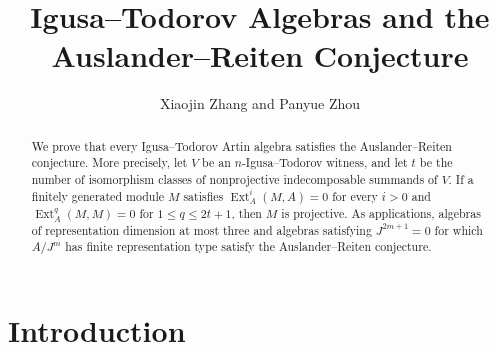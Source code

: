 \documentclass[a4paper,reqno]{amsart}
\numberwithin{equation}{section}
\theoremstyle{definition}
\DeclareMathOperator{\Ext}{Ext}
\begin{document}
\title[Igusa--Todorov algebras and the Auslander--Reiten conjecture]
{Igusa--Todorov Algebras and the Auslander--Reiten Conjecture}
\author[Xiaojin Zhang and Panyue Zhou]{Xiaojin Zhang and Panyue Zhou}

\makeatletter
{}
\makeatother
\date{}



\begin{abstract}
We prove that every Igusa--Todorov Artin algebra satisfies the Auslander--Reiten conjecture. More precisely, let $V$ be an $n$-Igusa--Todorov witness, and let $t$ be the number of isomorphism classes of nonprojective indecomposable summands of $V$. If a finitely generated module $M$ satisfies $\Ext_A^i(M,A)=0$ for every $i>0$ and $\Ext_A^q(M,M)=0$ for $1\leq q\leq 2t+1$, then $M$ is projective. As applications, algebras of representation dimension at most three and algebras satisfying $J^{2m+1}=0$ for which $A/J^m$ has finite representation type satisfy the Auslander--Reiten conjecture.
\end{abstract}

\maketitle

\section{Introduction}
\end{document}
